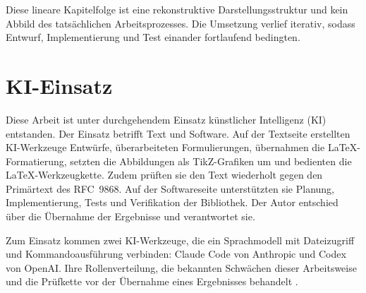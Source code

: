 Diese lineare Kapitelfolge ist eine rekonstruktive Darstellungsstruktur und kein Abbild des tatsächlichen
Arbeitsprozesses. Die Umsetzung verlief iterativ, sodass Entwurf, Implementierung und Test
einander fortlaufend bedingten.

\section{KI-Einsatz}
\label{sec:ki-offenlegung}

Diese Arbeit ist unter durchgehendem Einsatz künstlicher Intelligenz (KI) entstanden. Der Einsatz betrifft Text
und Software. Auf der Textseite erstellten KI-Werkzeuge Entwürfe, überarbeiteten Formulierungen, übernahmen die
LaTeX-Formatierung, setzten die Abbildungen als TikZ-Grafiken um und bedienten die LaTeX-Werkzeugkette.
Zudem prüften sie den Text wiederholt gegen den Primärtext
des RFC~9868. Auf der Softwareseite unterstützten sie Planung, Implementierung, Tests und Verifikation der
Bibliothek. Der Autor entschied über die Übernahme der Ergebnisse und verantwortet sie.

Zum Einsatz kommen zwei KI-Werkzeuge, die ein Sprachmodell mit Dateizugriff und
Kommandoausführung verbinden:
Claude Code von Anthropic und Codex von OpenAI. Ihre Rollenverteilung, die bekannten Schwächen dieser Arbeitsweise
und die Prüfkette vor der Übernahme eines Ergebnisses behandelt .
